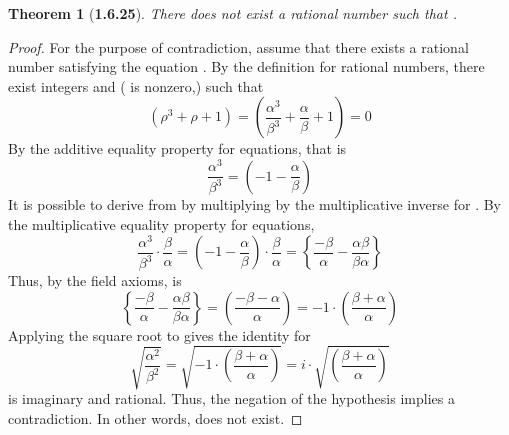 \documentclass[a4paper, 12pt]{article}
\theoremstyle{plain}
\newtheorem*{theorem*}{Theorem}
\begin{document}
\begin{theorem*}[\textbf{1.6.25}]
    There does not exist a rational number \bm{$\rho$} such that 
    .
\end{theorem*}
\begin{proof}
    For the purpose of contradiction, 
    assume that there exists a rational number \bm{$\rho$} satisfying the equation . 
    By the definition for rational numbers, 
    there exist integers \bm{$\alpha$} and \bm{$\beta$} (\bm{$\beta$} is nonzero,) such that 
    \begin{equation*}
        \left( 
            \rho ^3 + \rho + 1 
        \right) 
            = 
        \left( 
            \frac{\alpha^3}{\beta^3} + \frac{\alpha}{\beta} + 1 
        \right) 
            = 
        0
    \end{equation*}
    By the additive equality property for equations, that is
    \begin{equation*}
        \frac{\alpha^3}{\beta^3} 
            = 
        \left(
            -1 - \frac{\alpha}{\beta}
        \right)
    \end{equation*}
    It is possible to derive  from  
    by multiplying  by the multiplicative inverse for \bm{$\rho$}. 
    By the multiplicative equality property for equations,
    \begin{equation*}
        \frac{\alpha^3}{\beta^3} \cdot \frac{\beta}{\alpha}
            =
        \left(
            -1 - \frac{\alpha}{\beta}
        \right) 
            \cdot 
        \frac{\beta}{\alpha} 
            =
        \left\{
            \frac{-\beta}{\alpha} 
                - 
            \frac{\alpha \beta}{\beta \alpha}
        \right\}
    \end{equation*}
    Thus, by the field axioms,  is
    \begin{equation*}
        \left\{
            \frac{-\beta}{\alpha} 
                - 
            \frac{\alpha \beta}{\beta \alpha}
        \right\}
            = 
        \left(
            \frac{-\beta - \alpha}{\alpha}
        \right)
            = 
        -1 
            \cdot 
        \left( 
            \frac{\beta + \alpha}{\alpha}
        \right)
    \end{equation*}
    Applying the square root to  gives the identity for \bm{$\rho$}
    \begin{equation*}
        \sqrt{ \frac{\alpha^2}{\beta^2} } 
            =
        \sqrt{ -1 \cdot \left( \frac{\beta + \alpha}{\alpha} \right) } 
            =
        i \cdot \sqrt{ \left( \frac{\beta + \alpha}{\alpha} \right) }
    \end{equation*}
    \bm{$\rho$} is imaginary and rational. 
    Thus, the negation of the hypothesis implies a contradiction. 
    In other words, \bm{$\rho$} does not exist.
\color{lightgray} \end{proof}
\pagebreak
\end{document}
